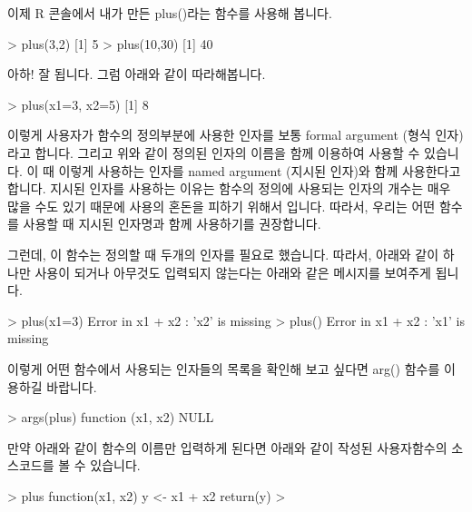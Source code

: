 이제 R 콘솔에서 내가 만든 plus()라는 함수를 사용해 봅니다. 

\begin{Schunk}
\begin{Soutput}
> plus(3,2)
[1] 5
> plus(10,30)
[1] 40
\end{Soutput}
\end{Schunk}

아하! 잘 됩니다. 
그럼 아래와 같이 따라해봅니다. 
\begin{Schunk}
\begin{Soutput}
> plus(x1=3, x2=5)
[1] 8
\end{Soutput}
\end{Schunk}

이렇게 사용자가 함수의 정의부분에 사용한 인자를 보통 formal argument (형식 인자)라고 합니다. 
그리고 위와 같이 정의된 인자의 이름을 함께 이용하여 사용할 수 있습니다. 
이 때 이렇게 사용하는 인자를  named argument (지시된 인자)와 함께 사용한다고 합니다. 
지시된 인자를 사용하는 이유는 함수의 정의에 사용되는 인자의 개수는 매우 많을 수도 있기 때문에 사용의 혼돈을 피하기 위해서 입니다. 
따라서, 우리는 어떤 함수를 사용할 때 지시된 인자명과 함께 사용하기를 권장합니다. 

그런데, 이 함수는 정의할 때 두개의 인자를 필요로 했습니다. 
따라서, 아래와 같이 하나만 사용이 되거나 아무것도 입력되지 않는다는 아래와 같은 메시지를 보여주게 됩니다. 

\begin{Schunk}
\begin{Soutput}
> plus(x1=3)
Error in x1 + x2 : 'x2' is missing
> plus()
Error in x1 + x2 : 'x1' is missing
\end{Soutput}
\end{Schunk}

이렇게 어떤 함수에서 사용되는 인자들의 목록을 확인해 보고 싶다면 arg() 함수를 이용하길 바랍니다. 

\begin{Schunk}
\begin{Soutput}
> args(plus)
function (x1, x2) 
NULL

\end{Soutput}
\end{Schunk}

만약 아래와 같이 함수의 이름만 입력하게 된다면 아래와 같이 작성된 사용자함수의 소스코드를 볼 수 있습니다. 

\begin{Schunk}
\begin{Soutput}
> plus
function(x1, x2){
y <- x1 + x2
return(y)
}
> 
\end{Soutput}
\end{Schunk}

